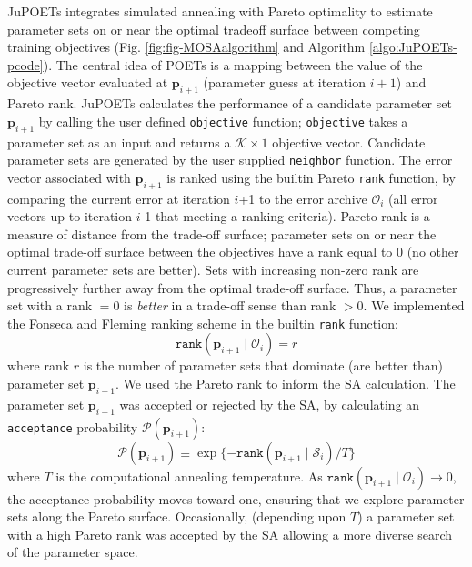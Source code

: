 \documentclass{bmcart}
\begin{document}
JuPOETs integrates simulated annealing with Pareto optimality to estimate parameter sets on or near the optimal tradeoff surface between competing training objectives
(Fig. \ref{fig:fig-MOSAalgorithm} and Algorithm \ref{algo:JuPOETs-pcode}).
The central idea of POETs is a mapping between the value of the objective vector evaluated at $\mathbf{p}_{i+1}$ (parameter guess at iteration $i+1$) and Pareto rank.
JuPOETs calculates the performance of a candidate parameter set $\mathbf{p}_{i+1}$ by calling the user defined \texttt{objective} function; \texttt{objective} takes
a parameter set as an input and returns a $\mathcal{K}\times{1}$ objective vector. Candidate parameter sets are generated by the user supplied \texttt{neighbor} function.
The error vector associated with $\mathbf{p}_{i+1}$ is ranked using the builtin Pareto \texttt{rank} function, by comparing the current error at iteration $i$+1 to the error archive $\mathcal{O}_{i}$ (all error vectors up to iteration $i$-1 that meeting a ranking criteria). Pareto rank is a measure of distance from the trade-off surface;
parameter sets on or near the optimal trade-off surface between the objectives have a rank equal to $0$ (no other current parameter sets are better).
Sets with increasing non-zero rank are progressively further away from the optimal trade-off surface.
Thus, a parameter set with a rank $=0$ is \emph{better} in a trade-off sense than rank $>0$.
We implemented the Fonseca and Fleming ranking scheme \cite{RANKING} in the builtin \texttt{rank} function:
\begin{equation}\label{eqn_rank}
\texttt{rank}\left(\mathbf{p}_{i+1}\mid \mathcal{O}_{i}\right)=r
\end{equation} where rank $r$ is the number of parameter sets that dominate (are better than) parameter set $\mathbf{p}_{i+1}$.
We used the Pareto rank to inform the SA calculation.
The parameter set $\mathbf{p}_{i+1}$ was accepted or rejected by the SA, by calculating an \texttt{acceptance} probability $\mathcal{P}\left(\mathbf{p}_{i+1}\right)$:
\begin{equation}\label{eqn_costMOSA}
\mathcal{P}(\mathbf{p}_{i+1}) \equiv \exp{\{-\texttt{rank}\left(\mathbf{p}_{i+1} \mid \mathcal{S}_{i} \right)/T\}}
\end{equation}
where $T$ is the computational annealing temperature.
As $\texttt{rank}\left(\mathbf{p}_{i+1}\mid \mathcal{O}_{i}\right)\rightarrow{0}$, the acceptance probability moves toward one,
ensuring that we explore parameter sets along the Pareto surface.
Occasionally, (depending upon $T$) a parameter set with a high Pareto rank was accepted by the SA allowing a more diverse search of the parameter space.
\end{document}
